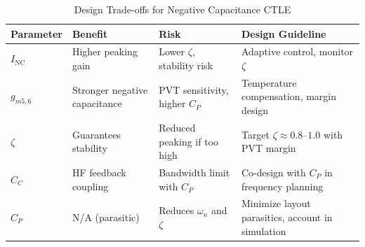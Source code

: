 \begin{table}[H]
\centering
\caption{Design Trade-offs for Negative Capacitance CTLE}
\label{tab:nc_ctle_tradeoffs}
\begin{tabular}{ >{\raggedright\arraybackslash}p{} 
                 >{\raggedright\arraybackslash}p{} 
                 >{\raggedright\arraybackslash}p{} 
                 >{\raggedright\arraybackslash}p{} }
\toprule
\textbf{Parameter} & \textbf{Benefit} & \textbf{Risk} & \textbf{Design Guideline} \\
\midrule
$I_{\text{NC}}$ & Higher peaking gain & Lower $\zeta$, stability risk & Adaptive control, monitor $\zeta$ \\
\midrule
$g_{m5,6}$ & Stronger negative capacitance & PVT sensitivity, higher $C_P$ & Temperature compensation, margin design \\
\midrule
$\zeta$ & Guarantees stability & Reduced peaking if too high & Target $\zeta \approx 0.8$–$1.0$ with PVT margin \\
\midrule
$C_C$ & HF feedback coupling & Bandwidth limit with $C_P$ & Co-design with $C_P$ in frequency planning \\
\midrule
$C_P$ & N/A (parasitic) & Reduces $\omega_n$ and $\zeta$ & Minimize layout parasitics, account in simulation \\
\bottomrule
\end{tabular}
\end{table}